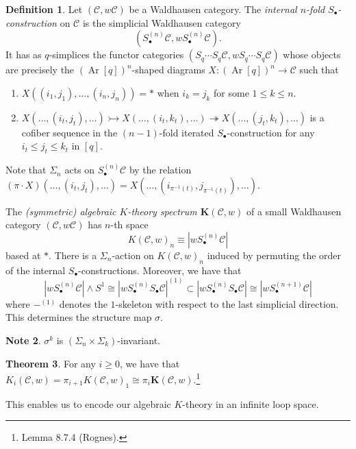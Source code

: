 \documentclass[10pt,letterpaper,cm]{nupset}
\theoremstyle{definition}
\newtheorem{definition}{Definition}[section]
\newtheorem{note}[definition]{Note}
\theoremstyle{theorem}
\newtheorem{theorem}[definition]{Theorem}
\theoremstyle{remark}
\newcommand{\1}{\mathbf{1}}
\renewcommand{\c}{\mathscr{C}}
\newcommand{\0}{\vec 0}
\DeclareMathOperator{\Ar}{Ar}
\begin{document}
\begin{definition}
Let $\left(\c,w{\c}\right)$ be a Waldhausen category. The \textit{internal $n$-fold $S_{\bullet}$-construction} on $\c$ is the simplicial Waldhausen category $$\left(S_{\bullet}^{(n)}\c, wS_{\bullet}^{(n)} \c\right).$$ It has as $q$-simplices the functor categories $\left(S_q \cdots S_q \c, wS_q \cdots S_q \c\right)$ whose objects are precisely the $\left(\Ar[q]\right)^n$-shaped diagrams  $X: \left(\Ar[q]\right)^n\to \c$ such that
\begin{enumerate}[label=(\roman*)]
\item $X((i_1, j_1), \ldots, (i_n, j_n)) = \ast$ when $i_k = j_k$ for some $1\leq k \leq n$.
\item $X(\ldots, (i_t, j_t), \ldots) \rightarrowtail X(\ldots, (i_t, k_t), \ldots) \twoheadrightarrow X(\ldots, (j_t, k_t), \ldots)$ is a cofiber sequence  in the $\left(n-1\right)$-fold iterated $S_{\bullet}$-construction for any $i_t \leq j_t \leq k_t$ in $\left[q\right]$.
\end{enumerate}
Note that $\Sigma_n$ acts on $S_{\bullet}^{(n)}\c$ by the relation $\left(\pi \cdot X\right)\left(\ldots, \left(i_t, j_t\right), \ldots\right) = X(\ldots, (i_{\pi^{{-1}}(t)}, j_{\pi^{{-1}}(t)}), \ldots)$.
\end{definition}

\medskip


The \textit{(symmetric) algebraic $K$-theory  spectrum $\mathbf{K}(\c, w)$} of a small Waldhausen category $\left(\c,w{\c}\right)$ has $n$-th space $$K(\c, w)_n \equiv \left\lvert{wS_{\bullet}^{(n)}\c}\right\rvert$$ based at $\ast$. There is a $\Sigma_n$-action on $K(\c, w)_n$ induced by permuting the order of the internal $S_{\bullet}$-constructions. Moreover, we have that $$\left\lvert{wS_{\bullet}^{(n)}\c}\right\rvert \land S^1 \cong \left\lvert{wS_{\bullet}^{(n)}S_{\bullet}\c}\right\rvert^{(1)} \subset \left\lvert{wS_{\bullet}^{(n)}S_{\bullet}\c}\right\rvert \cong \left\lvert{wS_{\bullet}^{(n+1)}\c}\right\rvert$$ where ${-}^{(1)}$ denotes the $1$-skeleton with respect to the last simplicial direction. This determines the structure map $\sigma$.

\begin{note}
$\sigma^k$ is $\left(\Sigma_{n} \times \Sigma_{k}\right)$-invariant.
\end{note}



\begin{theorem}\label{lt}
For any $i\geq 0$, we have that $K_i(\c, w) = \pi_{i+1}K(\c, w)_1 \cong \pi_i \mathbf{K}(\c, w)$.\footnote{Lemma 8.7.4 (Rognes).}
\end{theorem}



This enables us to encode our algebraic $K$-theory in an infinite loop space.
\end{document}
